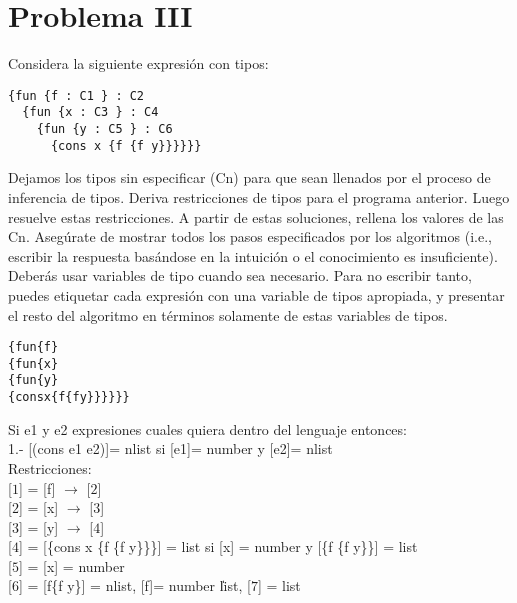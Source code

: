 \documentclass{article}
\begin{document}
  

\section*{Problema III}
Considera la siguiente expresión con tipos:

\begin{verbatim}
{fun {f : C1 } : C2
  {fun {x : C3 } : C4
    {fun {y : C5 } : C6
      {cons x {f {f y}}}}}}
\end{verbatim}

Dejamos los tipos sin especificar (Cn) para que sean llenados por el proceso
de inferencia de tipos. Deriva restricciones de tipos para el programa anterior.
Luego resuelve estas restricciones. A partir de estas soluciones, rellena los
valores de las Cn. Asegúrate de mostrar todos los pasos especificados por los
algoritmos (i.e., escribir la respuesta basándose en la intuición o el conocimiento
es insuficiente). Deberás usar variables de tipo cuando sea necesario.
Para no escribir tanto, puedes etiquetar cada expresión con una variable de tipos
apropiada, y presentar el resto del algoritmo en términos solamente de estas
variables de tipos.

\begin{alltt}
\{  fun \{f\}
  \{  fun \{x\}
    \{  fun \{y\}
      \{  cons  x   \{f  \{f y\}\}\}\}\}\}
\end{alltt}

Si e1 y e2 expresiones cuales quiera dentro del lenguaje entonces:\\
 1.- [(cons e1 e2)]= nlist si [e1]= number y [e2]= nlist\\

Restricciones:\\

[$\boxed{1}$] = [f] $\rightarrow$ [$\boxed{2}$] \\

[$\boxed{2}$] = [x] $\rightarrow$ [$\boxed{3}$] \\

[$\boxed{3}$] = [y] $\rightarrow$ [$\boxed{4}$] \\

[$\boxed{4}$] = [\{cons x \{f \{f y\}\}\}] = list si [x] = number y [\{f \{f y\}\}] = list \\

[$\boxed{5}$] = [x] = number\\

[$\boxed{6}$] = [f\{f y\}] = nlist, [f]= number \| list, [$\boxed{7}$] = list\\
\end{document}
